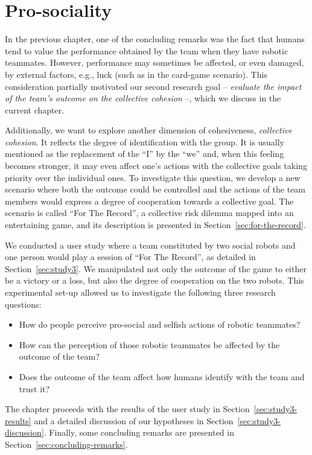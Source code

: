 \chapter{Pro-sociality}
\label{chapter:pro-sociality}

In the previous chapter, one of the concluding remarks was the fact that humans tend to value the performance obtained by the team when they have robotic teammates. However, performance may sometimes be affected, or even damaged, by external factors, e.g., luck (such as in the card-game scenario). This consideration partially motivated our second research goal -- \textit{evaluate the impact of the team’s outcome on the collective cohesion} --, which we  discuss in the current chapter.

Additionally, we want to explore another dimension of cohesiveness, \textit{collective cohesion}. It reflects the degree of identification with the group. It is usually mentioned as the replacement of the ``I'' by the ``we'' and, when this feeling becomes stronger, it may even affect one’s actions with the collective goals taking priority over the individual ones. To investigate this question, we develop a new scenario where both the outcome could be controlled and the actions of the team members would express a degree of cooperation towards a collective goal. The scenario is called ``For The Record'', a collective risk dilemma mapped into an entertaining game, and its description is presented in Section~\ref{sec:for-the-record}.

We conducted a user study where a team constituted by two social robots and one person would play a session of ``For The Record'', as detailed in Section~\ref{sec:study3}. We manipulated not only the outcome of the game to either be a victory or a loss, but also the degree of cooperation on the two robots. This experimental set-up allowed us to investigate the following three research questions:
\begin{itemize}
    \item How do people perceive pro-social and selfish actions of robotic teammates?
    \item How can the perception of those robotic teammates be affected by the outcome of the team?
    \item Does the outcome of the team affect how humans identify with the team and trust it?
\end{itemize}

The chapter proceeds with the results of the user study in Section~\ref{sec:study3-results} and a detailed discussion of our hypotheses in Section~\ref{sec:study3-discussion}. Finally, some concluding remarks are presented in Section~\ref{sec:concluding-remarks}.

